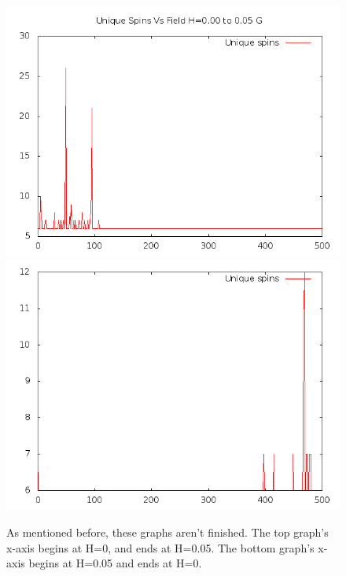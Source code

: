 \documentclass{article}
\begin{document}
\begin{figure}[ht]
\centering
\includegraphics[scale=0.5]{110/000to005Freq.png}
\includegraphics[scale=0.5]{110/005to000Freq.png}
\caption{As mentioned before, these graphs aren't finished. The top graph's x-axis begins at H=0, and ends at H=0.05.
The bottom graph's x-axis begins at H=0.05 and ends at H=0. }
\end{figure}
\clearpage
\end{document}
